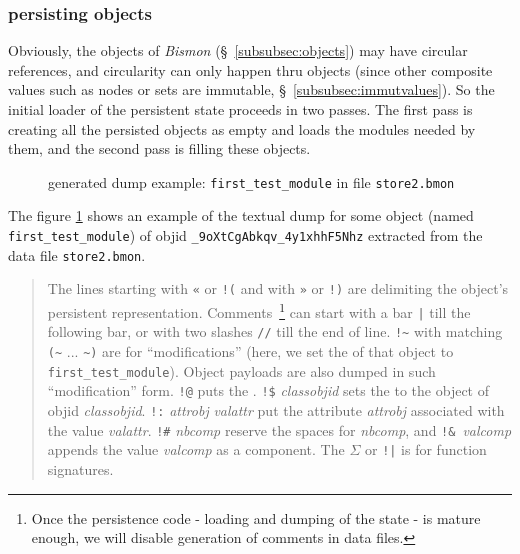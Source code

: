 {%
\subsubsection{persisting objects}
\label{subsubsec:persistobj}

Obviously, the objects of \emph{Bismon} (\S~\ref{subsubsec:objects})
may have circular references, and circularity can only happen thru
objects (since other composite values such as nodes or sets are
immutable, \S~\ref{subsubsec:immutvalues}). So the initial loader of
the persistent state proceeds in two passes. The first pass is
creating all the persisted objects as empty and loads the modules
needed by them, and the second pass is filling these objects.

\bigskip

\begin{figure}[h]
\fbox{\parbox{\textwidth}{
\begin{scriptsize}
  
\end{scriptsize}
}}
  \caption{generated dump example: \texttt{first\_test\_module} in file
    \texttt{store2.bmon}}
  \label{fig:objdumpfirsttestmodule}
\end{figure}

\bigskip

The figure \ref{fig:objdumpfirsttestmodule} shows an example of the
textual dump for some object (named \texttt{first\_test\_module}) of
objid {\small\texttt{\_9oXtCgAbkqv\_4y1xhhF5Nhz}} extracted from the
data file \texttt{store2.bmon}.

\medskip

\begin{quote}
\begin{small}
The lines starting with \texttt{«} or
\texttt{!(} and with
\texttt{»} or \texttt{!)}
are delimiting the object's persistent representation. %
Comments~\footnote{Once the persistence code - loading and
dumping of the state - is mature enough, we will disable generation of
comments in data files.} can start with a bar \texttt{|} till the
      following bar, or with two slashes \texttt{//} till the end of
      line.  {\verb+!~+} with matching {\verb+(~+} ... \verb+~)+ are
      for ``modifications'' (here, we set the
       of that object to
      \texttt{first\_test\_module}). Object payloads are also dumped
      in such ``modification'' form. \verb+!@+ puts the
      . \verb+!$+ \textit{classobjid} sets
      the  to the object of objid
      \textit{classobjid}. \verb+!:+ \textit{attrobj} \textit{valattr}
      put the attribute \textit{attrobj} associated with the value
      \textit{valattr}. \verb+!#+ \textit{nbcomp} reserve the spaces
      for \textit{nbcomp}, and \verb/!&/~\textit{valcomp} appends the
      value \textit{valcomp} as a component. The
      $\mathtt{\Sigma}$ or
      \verb+!|+
      is for  function signatures.


\end{small}
\end{quote}}
